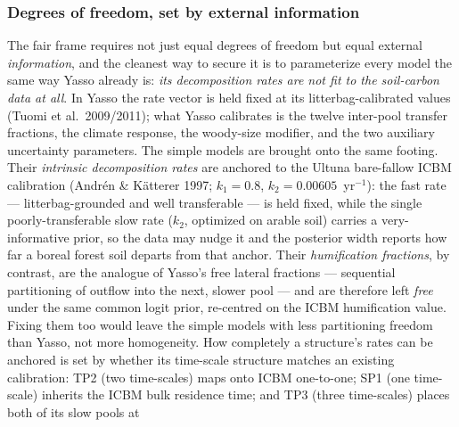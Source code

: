 \documentclass[11pt]{article}
\begin{document}
\subsubsection{Degrees of freedom, set by external information}
The fair frame requires not just equal degrees of freedom but equal external
\emph{information}, and the cleanest way to secure it is to parameterize every
model the same way Yasso already is: \emph{its decomposition rates are not fit to
the soil-carbon data at all}. In Yasso the rate vector is held fixed at its
litterbag-calibrated values (Tuomi et al.\ 2009/2011); what Yasso calibrates is
the twelve inter-pool transfer fractions, the climate response, the woody-size
modifier, and the two auxiliary uncertainty parameters. The simple models are
brought onto the same footing. Their \emph{intrinsic decomposition rates} are
anchored to the Ultuna bare-fallow ICBM calibration (Andr\'en \& K\"atterer 1997;
$k_1=0.8$, $k_2=0.00605$~yr$^{-1}$): the fast rate --- litterbag-grounded and
well transferable --- is held fixed, while the single poorly-transferable slow
rate ($k_2$, optimized on arable soil) carries a very-informative prior, so the
data may nudge it and the posterior width reports how far a boreal forest soil
departs from that anchor. Their \emph{humification fractions}, by contrast, are
the analogue of Yasso's free lateral fractions --- sequential partitioning of
outflow into the next, slower pool --- and are therefore left \emph{free} under
the same common logit prior, re-centred on the ICBM humification value. Fixing
them too would leave the simple models with less partitioning freedom than Yasso,
not more homogeneity. How completely a structure's rates can be anchored is set by
whether its time-scale structure matches an existing calibration: TP2 (two
time-scales) maps onto ICBM one-to-one; SP1 (one time-scale) inherits the ICBM
bulk residence time; and TP3 (three time-scales) places both of its slow pools at
\end{document}
